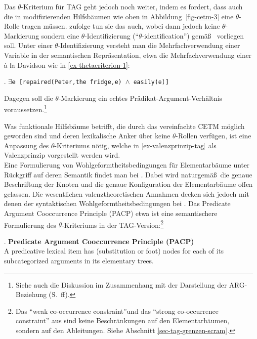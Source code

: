 Das $\theta$-Kriterium für TAG geht jedoch noch weiter, indem es fordert, dass auch die  in modifizierenden Hilfsbäumen wie oben in Abbildung~\ref{fig-cetm-3} eine $\theta$-Rolle tragen müssen. \citet[63f]{Frank:02} zufolge tun sie das auch, wobei dann jedoch keine $\theta$-Markierung sondern eine $\theta$-Identifizierung ("`$\theta$-identification"') gemä\ss\ \citet[564]{Higginbotham:85} vorliegen soll. Unter einer $\theta$-Identifizierung versteht man die Mehrfachverwendung einer Variable in der semantischen Repräsentation, etwa die Mehrfachverwendung einer  \`a la Davidson wie in \ref{ex-thetacriterion-1}:

\ex. \label{ex-thetacriterion-1} {\tt $\exists$e [repaired(Peter,the fridge,e) $\wedge$ easily(e)]}

Dagegen soll die $\theta$-Markierung ein echtes Prädikat-Argument-Verhältnis voraussetzen.\footnote{Siehe auch die Diskussion im Zusammenhang mit der Darstellung der ARG-Beziehung (S.~\pageref{sec-arg}ff).}

Was funktionale Hilfsbäume betrifft, die durch das vereinfachte CETM möglich geworden sind und deren lexikalische Anker über keine $\theta$-Rollen verfügen, ist eine Anpassung des $\theta$-Kriteriums nötig, welche in \ref{ex-valenzprinzip-tag} als Valenzprinzip vorgestellt werden wird.   \\

Eine Formulierung von Wohlgeformtheitsbedingungen für Elementarbäume unter Rückgriff auf deren Semantik findet man bei \citet[21f]{Abeille:Rambow:00}. Dabei wird naturgemä\ss \ die genaue Beschriftung der Knoten und die genaue Konfiguration der Elementarbäume offen gelassen. Die wesentlichen valenztheoretischen Annahmen decken sich jedoch mit denen der syntaktischen Wohlgeformtheitsbedingungen bei \cite{Frank:02}. Das Predicate Argument Co\-occurrence Principle (PACP) etwa ist eine semantischere Formulierung des $\theta$-Kriteriums in der TAG-Version:\footnote{Das "`weak co-occurrence constraint"'und das "`strong co-occurrence constraint"' aus \cite{Joshi:Becker:Rambow:00} sind keine Beschränkungen auf den Elementarbäumen, sondern auf den Ableitungen. Siehe Abschnitt \ref{sec-tag-grenzen-scram}.} 

\ex. {\bf Predicate Argument Cooccurrence Principle (PACP)} \\
A predicative lexical item has (substitution or foot) nodes for each of its subcategorized arguments in its elementary trees. 

